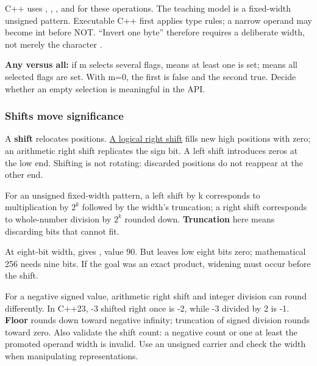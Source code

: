 C++ uses \BookInlineCode{\&}, \BookInlineCode{\textbar{}}, \BookInlineCode{\^{}}, and \BookInlineCode{\textasciitilde{}} for these operations. The teaching model is a fixed-width unsigned pattern. Executable C++ first applies type rules; a narrow operand may become int before NOT. ``Invert one byte'' therefore requires a deliberate width, not merely the character \BookInlineCode{\textasciitilde{}}.

\textbf{Any versus all:} if m selects several flags,  means at least one is set;  means all selected flags are set. With m=0, the first is false and the second true. Decide whether an empty selection is meaningful in the API.

\subsubsection{Shifts move significance}\label{01-foundations-i-ch001-shifts-move-significance}

\hypertarget{01-foundations-i-ch001-shifts-move-significance}{}

A \textbf{shift} relocates positions. \hyperref[appendix-73425b25118e]{A logical right shift} fills new high positions with zero; an arithmetic right shift replicates the sign bit. A left shift introduces zeros at the low end. Shifting is not rotating: discarded positions do not reappear at the other end.

For an unsigned fixed-width pattern, a left shift by k corresponds to multiplication by \(2^k\) followed by the width's truncation; a right shift corresponds to whole-number division by \(2^k\) rounded down. \textbf{Truncation} here means discarding bits that cannot fit.

At eight-bit width,  gives , value 90. But  leaves low eight bits zero; mathematical 256 needs nine bits. If the goal was an exact product, widening must occur before the shift.

For a negative signed value, arithmetic right shift and integer division can round differently. In C++23, -3 shifted right once is -2, while -3 divided by 2 is -1. \textbf{Floor} rounds down toward negative infinity; truncation of signed division rounds toward zero. Also validate the shift count: a negative count or one at least the promoted operand width is invalid. Use an unsigned carrier and check the width when manipulating representations.

